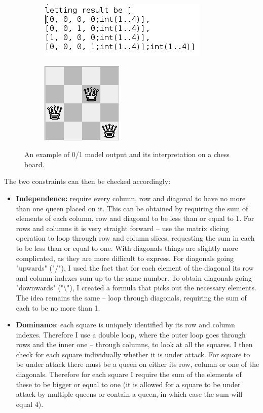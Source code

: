 \documentclass{report}
\begin{document}
\begin{figure}
\begin{subfigure}{.5\textwidth}
\includegraphics[scale=0.65]{images/p1.png}
  \label{fig:sub1}
\end{subfigure}%
\begin{subfigure}{.5\textwidth}
\hspace{2cm}
\includegraphics[scale=0.65]{images/p1_vis.png}
  \label{fig:sub2}
\end{subfigure}
\caption{An example of 0/1 model output and its interpretation on a chess board.}
\label{fig:test}
\end{figure}

The two constraints can then be checked accordingly:
\begin{itemize}
\item \textbf{Independence:} require every column, row and diagonal to have no more than one queen placed on it. This can be obtained by requiring the sum of elements of each column, row and diagonal to be less than or equal to 1. For rows and columns it is very straight forward -- use the matrix slicing operation to loop through row and column slices, requesting the sum in each to be less than or equal to one. With diagonals things are slightly more complicated, as they are more difficult to express. For diagonals going "upwards" ("/"), I used the fact that for each element of the diagonal its row and column indexes sum up to the same number. To obtain  diagonals going "downwards" ("\textbackslash "), I created a formula that picks out the necessary elements. The idea remains the same -- loop through diagonals, requiring the sum of each to be no more than 1.
\item \textbf{Dominance}: each square is uniquely identified by its row and column indexes. Therefore I use a double loop, where the outer loop goes through rows and the inner one -- through columns, to look at all the squares. I then check for each square individually whether it is under attack. For square to be under attack there must be a queen on either its row, column or one of the diagonals. Therefore for each square I require the sum of the elements of these to be bigger or equal to one (it is allowed for a square to be under attack by multiple queens or contain a queen, in which case the sum will equal 4).
\end{itemize}
\end{document}

